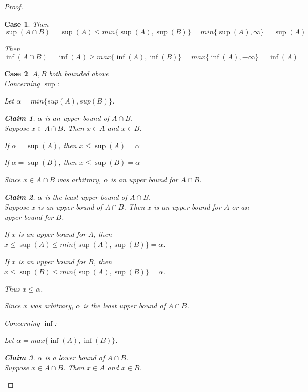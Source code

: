 \documentclass{article} %
\theoremstyle{plain}
\newtheorem*{claim*}{Claim}
\newtheorem{case}{Case}
\theoremstyle{definition}
\begin{document}
\begin{proof}
\begin{case}
        Then $\sup(A \cap B) = \sup(A) \leq min\{\sup(A), \sup(B)\} = min\{\sup(A), \infty \} = \sup(A)$

        Then $\inf(A \cap B) = \inf(A) \geq max\{\inf(A), \inf(B)\} = max\{\inf(A), -\infty \} = \inf(A)$
    \end{case}
    \begin{case} $A,B$ both bounded above \\
        Concerning $\sup$:
        \begin{adjustwidth}{2em}{0pt}
            Let $\alpha = min\{sup(A), sup(B)\}$.
            \begin{claim*} $\alpha$ is an upper bound of $A \cap B$. \\
                Suppose $x \in A \cap B$.  Then $x \in A$ and $x \in B$.

                If $\alpha = \sup(A)$, then $x \leq \sup(A) = \alpha$

                If $\alpha = \sup(B)$, then $x \leq \sup(B) = \alpha$

                Since $x \in A \cap B$ was arbitrary, $\alpha$ is an upper bound for $A \cap B$.
            \end{claim*}
            \begin{claim*} $\alpha$ is the least upper bound of $A \cap B$. \\
                Suppose $x$ is an upper bound of $A \cap B$. Then $x$ is an upper bound for $A$ or an upper bound for $B$.

                If $x$ is an upper bound for $A$, then $x \leq \sup(A) \leq min\{\sup(A), \sup(B)\} = \alpha$.

                If $x$ is an upper bound for $B$, then $x \leq \sup(B) \leq min\{\sup(A), \sup(B)\} = \alpha$.

                Thus $x \leq \alpha$.

                Since $x$ was arbitrary, $\alpha$ is the least upper bound of $A \cap B$.
            \end{claim*}
        \end{adjustwidth}

        Concerning $\inf$:
        \begin{adjustwidth}{2em}{0pt}
            Let $\alpha = max\{\inf(A), \inf(B)\}$.
            \begin{claim*} $\alpha$ is a lower bound of $A \cap B$. \\
                Suppose $x \in A \cap B$.  Then $x \in A$ and $x \in B$.


\end{claim*}
\end{adjustwidth}
\end{case}
\end{proof}
\end{document}
